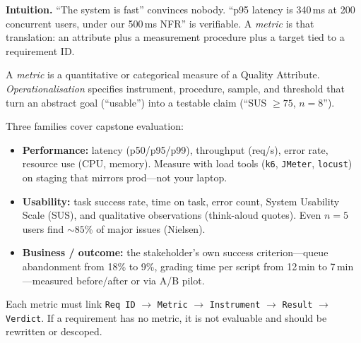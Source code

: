 \textbf{Intuition.} ``The system is fast'' convinces nobody. ``p95 latency is 340\,ms at 200 concurrent users, under our 500\,ms NFR'' is verifiable. A \emph{metric} is that translation: an attribute plus a measurement procedure plus a target tied to a requirement ID.

\begin{definition}
A \emph{metric} is a quantitative or categorical measure of a Quality Attribute. \emph{Operationalisation} specifies instrument, procedure, sample, and threshold that turn an abstract goal (``usable'') into a testable claim (``SUS $\ge 75$, $n=8$'').
\end{definition}

Three families cover capstone evaluation:

\begin{itemize}
    \item \textbf{Performance:} latency (p50/p95/p99), throughput (req/s), error rate, resource use (CPU, memory). Measure with load tools (\texttt{k6}, \texttt{JMeter}, \texttt{locust}) on staging that mirrors prod---not your laptop.
    \item \textbf{Usability:} task success rate, time on task, error count, System Usability Scale (SUS), and qualitative observations (think-aloud quotes). Even $n=5$ users find $\sim85$\% of major issues (Nielsen).
    \item \textbf{Business / outcome:} the stakeholder's own success criterion---queue abandonment from 18\% to 9\%, grading time per script from 12\,min to 7\,min---measured before/after or via A/B pilot.
\end{itemize}

Each metric must link \texttt{Req ID} $\to$ \texttt{Metric} $\to$ \texttt{Instrument} $\to$ \texttt{Result} $\to$ \texttt{Verdict}. If a requirement has no metric, it is not evaluable and should be rewritten or descoped.

